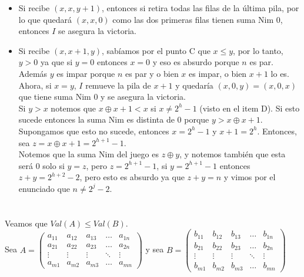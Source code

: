 \documentclass[a4paper]{article}
\begin{document}
\begin{itemize}
\item Si recibe $(x,x,y+1)$, entonces si retira todas las filas de la última pila, por lo que quedará $(x,x,0)$ como las dos primeras filas tienen suma Nim 0, entonces $I$ se asegura la victoria.

\item Si recibe $(x,x+1,y)$, sabíamos por el punto C que $x \leq y$, por lo tanto, $y > 0$ ya que si $y = 0$ entonces $x = 0$ y eso es absurdo porque $n$ es par. Además $y$ es impar porque $n$ es par y o bien $x$ es impar, o bien $x+1$ lo es. \\ 
Ahora, si $x = y$, $I$ remueve la pila de $x+1$ y quedaría $(x,0,y) = (x,0,x)$ que tiene suma Nim 0 y se asegura la victoria. \\ 

Si $y > x$ notemos que $x \oplus x+1 < x$ si $x \not= 2^h -1$ (visto en el item D). Si esto sucede entonces la suma Nim es distinta de 0 porque $y > x \oplus x+1$.
Supongamos que esto no sucede, entonces $x = 2^h -1$ y $x + 1 = 2^h$. Entonces, sea  $ z = x \oplus x + 1 = 2^{h+1} -1$.\\
Notemos que la suma Nim del juego es $z \oplus y$, y notemos también que esta será 0 solo si $y = z$, pero $z = 2^{h+1} -1$, si $y = 2^{h+1} -1$ entonces $z + y = 2^{h+2} -2$, pero esto es absurdo ya que $z + y = n$ y  vimos por el enunciado que $n \not= 2^{j} -2$.

\end{itemize}


\section{}

\subsection{}

Veamos que $Val(A) \leq Val(B)$. \\ 

Sea $A = \begin{pmatrix}
    a_{11}       & a_{12} & a_{13} & \dots & a_{1n} \\
    a_{21}       & a_{22} & a_{23} & \dots & a_{2n} \\
     \vdots & \vdots & \vdots & \ddots & \vdots \\
    a_{m1}       & a_{m2} & a_{m3} & \dots & a_{mn}
\end{pmatrix}$ y sea $B = \begin{pmatrix}
    b_{11}       & b_{12} & b_{13} & \dots & b_{1n} \\
    b_{21}       & b_{22} & b_{23} & \dots & b_{2n} \\
     \vdots & \vdots & \vdots & \ddots & \vdots \\
    b_{m1}       & b_{m2} & b_{m3} & \dots & b_{mn}
\end{pmatrix}$ \\ 
\end{document}

